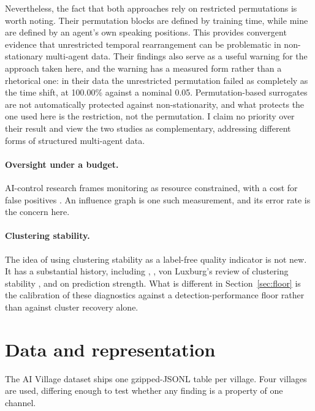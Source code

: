 \documentclass[10pt]{article}
\begin{document}
Nevertheless, the fact that both approaches rely on restricted permutations is worth noting. Their
permutation blocks are defined by training time, while mine are defined by an agent's own speaking
positions. This provides convergent evidence that unrestricted temporal rearrangement can be
problematic in non-stationary multi-agent data. Their findings also serve as a useful warning for
the approach taken here, and the warning has a measured form rather than a rhetorical one: in their
data the unrestricted permutation failed as completely as the time shift, at 100.00\% against a
nominal 0.05. Permutation-based surrogates are not automatically protected against
non-stationarity, and what protects the one used here is the restriction, not the permutation. I
claim no priority over their result and view the two studies as complementary, addressing different
forms of structured multi-agent data.

\paragraph{Oversight under a budget.} AI-control research frames monitoring as resource constrained,
with a cost for false positives \citep{greenblatt2024}. An influence graph is one such measurement,
and its error rate is the concern here.

\paragraph{Clustering stability.} The idea of using clustering stability as a label-free quality
indicator is not new. It has a substantial history, including \citet{benhur2002},
\citet{lange2004}, von Luxburg's review of clustering stability \citep{vonluxburg2010}, and
\citet{tibshirani2005} on prediction strength. What is different in Section~\ref{sec:floor} is the
calibration of these diagnostics against a detection-performance floor rather than against cluster
recovery alone.

\section{Data and representation}

The AI Village dataset ships one gzipped-JSONL table per village. Four villages are used, differing
enough to test whether any finding is a property of one channel.
\end{document}
